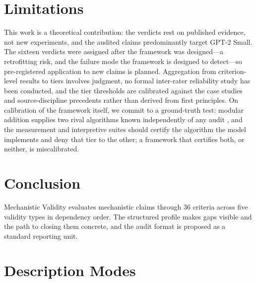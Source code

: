 \documentclass{article}
\begin{document}
\section{Limitations}
\label{sec:limitations}

This work is a theoretical contribution: the verdicts rest on published evidence, not new experiments, and the audited claims predominantly target GPT-2 Small. The sixteen verdicts were assigned after the framework was designed---a retrofitting risk, and the failure mode the framework is designed to detect---so pre-registered application to new claims is planned. Aggregation from criterion-level results to tiers involves judgment, no formal inter-rater reliability study has been conducted, and the tier thresholds are calibrated against the case studies and source-discipline precedents rather than derived from first principles. On calibration of the framework itself, we commit to a ground-truth test: modular addition supplies two rival algorithms known independently of any audit \citep{zhong2023clock}, and the measurement and interpretive suites should certify the algorithm the model implements and deny that tier to the other; a framework that certifies both, or neither, is miscalibrated.

\section{Conclusion}
\label{sec:conclusion}

Mechanistic Validity evaluates mechanistic claims through 36 criteria across five validity types in dependency order. The structured profile makes gaps visible and the path to closing them concrete, and the audit format is proposed as a standard reporting unit.




\clearpage
\appendix

\section{Description Modes}
\label{appendix:modes}
\end{document}
